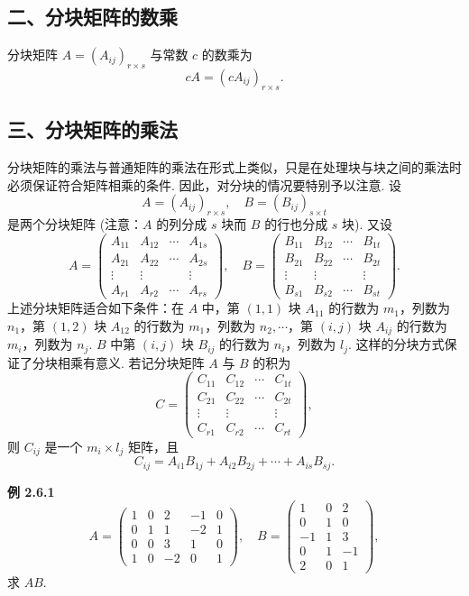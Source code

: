 \documentclass[UTF8,12pt,a4paper,fontset=fandol]{ctexart}
\begin{document}
\subsection*{二、分块矩阵的数乘}

分块矩阵 $A=(A_{ij})_{r\times s}$ 与常数 $c$ 的数乘为
\[
cA=(cA_{ij})_{r\times s}.
\]

\subsection*{三、分块矩阵的乘法}

分块矩阵的乘法与普通矩阵的乘法在形式上类似，只是在处理块与块之间的乘法时必须保证符合矩阵相乘的条件. 因此，对分块的情况要特别予以注意. 设
\[
A=(A_{ij})_{r\times s},\quad B=(B_{ij})_{s\times t}
\]
是两个分块矩阵 (注意：$A$ 的列分成 $s$ 块而 $B$ 的行也分成 $s$ 块). 又设
\[
A=\left(\begin{array}{cccc}
A_{11} & A_{12} & \cdots & A_{1s}\\
A_{21} & A_{22} & \cdots & A_{2s}\\
\vdots & \vdots & & \vdots\\
A_{r1} & A_{r2} & \cdots & A_{rs}
\end{array}\right),\quad
B=\left(\begin{array}{cccc}
B_{11} & B_{12} & \cdots & B_{1t}\\
B_{21} & B_{22} & \cdots & B_{2t}\\
\vdots & \vdots & & \vdots\\
B_{s1} & B_{s2} & \cdots & B_{st}
\end{array}\right).
\]
上述分块矩阵适合如下条件：在 $A$ 中，第 $(1,1)$ 块 $A_{11}$ 的行数为 $m_1$，列数为 $n_1$，第 $(1,2)$ 块 $A_{12}$ 的行数为 $m_1$，列数为 $n_2,\cdots$，第 $(i,j)$ 块 $A_{ij}$ 的行数为 $m_i$，列数为 $n_j$. $B$ 中第 $(i,j)$ 块 $B_{ij}$ 的行数为 $n_i$，列数为 $l_j$. 这样的分块方式保证了分块相乘有意义. 若记分块矩阵 $A$ 与 $B$ 的积为
\[
C=\left(\begin{array}{cccc}
C_{11} & C_{12} & \cdots & C_{1t}\\
C_{21} & C_{22} & \cdots & C_{2t}\\
\vdots & \vdots & & \vdots\\
C_{r1} & C_{r2} & \cdots & C_{rt}
\end{array}\right),
\]
则 $C_{ij}$ 是一个 $m_i\times l_j$ 矩阵，且
\[
C_{ij}=A_{i1}B_{1j}+A_{i2}B_{2j}+\cdots+A_{is}B_{sj}.
\]

\noindent\textbf{例 2.6.1}\quad
\[
A=\left(\begin{array}{cc|c|cc}
1 & 0 & 2 & -1 & 0\\
0 & 1 & 1 & -2 & 1\\ \hline
0 & 0 & 3 & 1 & 0\\
1 & 0 & -2 & 0 & 1
\end{array}\right),\quad
B=\left(\begin{array}{cc|c}
1 & 0 & 2\\
0 & 1 & 0\\ \hline
-1 & 1 & 3\\ \hline
0 & 1 & -1\\
2 & 0 & 1
\end{array}\right),
\]
求 $AB$.
\end{document}
